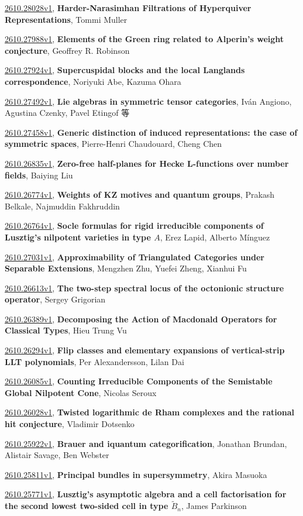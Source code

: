 \documentclass[9pt, a4paper]{article}
\theoremstyle{plain}
\theoremstyle{definition}
\theoremstyle{remark}
\newcommand{\arxiv}[3]{\href{https://arxiv.org/abs/#1}{#1}, \textbf{\textcolor{arxivblue}{#2}}, #3}
\begin{document}
\arxiv{2610.28028v1}{Harder-Narasimhan Filtrations of Hyperquiver Representations}{Tommi Muller}

\arxiv{2610.27988v1}{Elements of the Green ring related to Alperin's weight conjecture}{Geoffrey R. Robinson}

\arxiv{2610.27924v1}{Supercuspidal blocks and the local Langlands correspondence}{Noriyuki Abe, Kazuma Ohara}

\arxiv{2610.27492v1}{Lie algebras in symmetric tensor categories}{Iván Angiono, Agustina Czenky, Pavel Etingof 等}

\arxiv{2610.27458v1}{Generic distinction of induced representations: the case of symmetric spaces}{Pierre-Henri Chaudouard, Cheng Chen}

\arxiv{2610.26835v1}{Zero-free half-planes for Hecke L-functions over number fields}{Baiying Liu}

\arxiv{2610.26774v1}{Weights of KZ motives and quantum groups}{Prakash Belkale, Najmuddin Fakhruddin}

\arxiv{2610.26764v1}{Socle formulas for rigid irreducible components of Lusztig's nilpotent varieties in type $A$}{Erez Lapid, Alberto Mínguez}

\arxiv{2610.27031v1}{Approximability of Triangulated Categories under Separable Extensions}{Mengzhen Zhu, Yuefei Zheng, Xianhui Fu}

\arxiv{2610.26613v1}{The two-step spectral locus of the octonionic structure operator}{Sergey Grigorian}

\arxiv{2610.26389v1}{Decomposing the Action of Macdonald Operators for Classical Types}{Hieu Trung Vu}

\arxiv{2610.26294v1}{Flip classes and elementary expansions of vertical-strip LLT polynomials}{Per Alexandersson, Lilan Dai}

\arxiv{2610.26085v1}{Counting Irreducible Components of the Semistable Global Nilpotent Cone}{Nicolas Seroux}

\arxiv{2610.26028v1}{Twisted logarithmic de Rham complexes and the rational hit conjecture}{Vladimir Dotsenko}

\arxiv{2610.25922v1}{Brauer and iquantum categorification}{Jonathan Brundan, Alistair Savage, Ben Webster}

\arxiv{2610.25811v1}{Principal bundles in supersymmetry}{Akira Masuoka}

\arxiv{2610.25771v1}{Lusztig's asymptotic algebra and a cell factorisation for the second lowest two-sided cell in type $\tilde{B}_n$}{James Parkinson}
\end{document}
